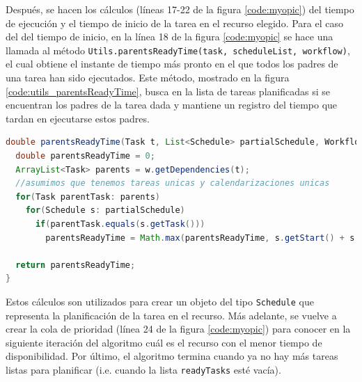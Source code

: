Después, se hacen los cálculos (líneas 17-22 de la figura \ref{code:myopic}) del tiempo de ejecución y el tiempo de inicio de la tarea en el recurso elegido. Para el caso del del tiempo de inicio, en la línea 18 de la figura \ref{code:myopic} se hace una llamada al método \texttt{Utils.parentsReadyTime(task, scheduleList, workflow)}, el cual obtiene el instante de tiempo más pronto en el que todos los padres de una tarea han sido ejecutados. Este método, mostrado en la figura \ref{code:utils_parentsReadyTime}, busca en la lista de tareas planificadas si se encuentran los padres de la tarea dada y mantiene un registro del tiempo que tardan en ejecutarse estos padres.

\begin{lstlisting}[language=java,label={code:utils_parentsReadyTime},caption={Método que calcula el tiempo mínimo en el que los padres de una tarea dada han sido ejecutados.},float]
double parentsReadyTime(Task t, List<Schedule> partialSchedule, Workflow w) {
  double parentsReadyTime = 0;
  ArrayList<Task> parents = w.getDependencies(t);
  //asumimos que tenemos tareas unicas y calendarizaciones unicas
  for(Task parentTask: parents)
    for(Schedule s: partialSchedule)
      if(parentTask.equals(s.getTask()))
        parentsReadyTime = Math.max(parentsReadyTime, s.getStart() + s.getDuration());

  return parentsReadyTime;
}
\end{lstlisting}

Estos cálculos son utilizados para crear un objeto del tipo \texttt{Schedule} que representa la planificación de la tarea en el recurso. Más adelante, se vuelve a crear la cola de prioridad (línea 24 de la figura \ref{code:myopic}) para conocer en la siguiente iteración del algoritmo cuál es el recurso con el menor tiempo de disponibilidad. Por último, el algoritmo termina cuando ya no hay más tareas listas para planificar (i.e. cuando la lista \texttt{readyTasks} esté vacía).


